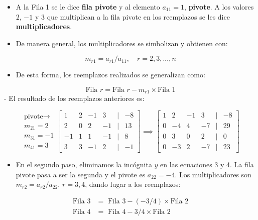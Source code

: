 \documentclass[openany]{book}
\providecommand{\tightlist}{%
  \setlength{\itemsep}{0pt}\setlength{\parskip}{0pt}}
\begin{document}
\begin{itemize}
\tightlist
\item
  A la Fila 1 se le dice \textbf{fila pivote} y al elemento \(a_{11}=1\), \textbf{pivote}. A los valores \(2\), \(-1\) y \(3\) que multiplican a la fila pivote en los reemplazos se les dice \textbf{multiplicadores}.
\item
  De manera general, los multiplicadores se simbolizan y obtienen con:
\end{itemize}

\[m_{r1} = a_{r1} / a_{11}, \quad r = 2, 3, ..., n\]

\begin{itemize}
\tightlist
\item
  De esta forma, los reemplazos realizados se generalizan como:
\end{itemize}

\[\text{Fila } r = \text{Fila } r - m_{r1} \times \text{Fila 1}\]
- El resultado de los reemplazos anteriores es:

\[
\begin{matrix}
\text{pivote} \rightarrow \\ m_{21} = 2 \\ m_{31} = -1 \\ m_{41} = 3
\end{matrix}
\begin{bmatrix}
1 & 2 & -1 & 3 &|& -8\\
2 & 0 & 2 & -1 &|& 13\\
-1 & 1 & 1 & -1 &|& 8\\
3 & 3 & -1 & 2 &|& -1  
\end{bmatrix}
\implies
\begin{bmatrix}
1 & 2 & -1 & 3 &|& -8\\
0 & -4 & 4 & -7 &|& 29\\
0 & 3 & 0 & 2 &|& 0\\
0 & -3 & 2 & -7 &|& 23  
\end{bmatrix}
\]

\begin{itemize}
\tightlist
\item
  En el segundo paso, eliminamos la incógnita \(y\) en las ecuaciones 3 y 4. La fila pivote pasa a ser la segunda y el pivote es \(a_{22}=-4\). Los multiplicadores son \(m_{r2}=a_{r2}/a_{22}\), \(r=3,4\), dando lugar a los reemplazos:
\end{itemize}

\[
\begin{array}{cl}
\text{Fila 3} &= \text{ Fila 3} - (-3/4) \times \text{Fila 2} \\
\text{Fila 4} &= \text{ Fila 4} - 3/4 \times \text{Fila 2} 
\end{array}
\]
\end{document}
